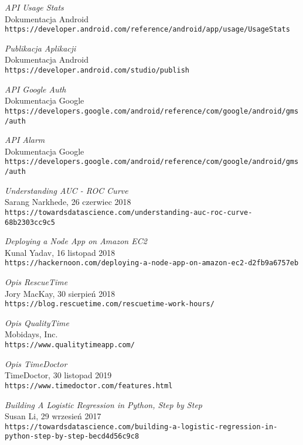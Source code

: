 \begin{thebibliography}{20}
\textit{API Usage Stats}
\\Dokumentacja Android
\\\texttt{https://developer.android.com/reference/android/app/usage/UsageStats}

\textit{Publikacja Aplikacji}
\\Dokumentacja Android
\\\texttt{https://developer.android.com/studio/publish}


\textit{API Google Auth}
\\Dokumentacja Google
\\\texttt{https://developers.google.com/android/reference/com/google/android/gms/auth}

\textit{API Alarm}
\\Dokumentacja Google
\\\texttt{https://developers.google.com/android/reference/com/google/android/gms/auth}

\textit{Understanding AUC - ROC Curve}
\\Sarang Narkhede, 26 czerwiec 2018
\\\texttt{https://towardsdatascience.com/understanding-auc-roc-curve-68b2303cc9c5}

\textit{Deploying a Node App on Amazon EC2}
\\Kunal Yadav, 16 listopad 2018
\\\texttt{https://hackernoon.com/deploying-a-node-app-on-amazon-ec2-d2fb9a6757eb}

\textit{Opis RescueTime}
\\Jory MacKay, 30 sierpień 2018
\\\texttt{https://blog.rescuetime.com/rescuetime-work-hours/}

\textit{Opis QualityTime}
\\Mobidays, Inc.
\\\texttt{https://www.qualitytimeapp.com/}



\textit{Opis TimeDoctor}
\\TimeDoctor, 30 listopad 2019
\\\texttt{https://www.timedoctor.com/features.html}

\textit{Building A Logistic Regression in Python, Step by Step}
\\Susan Li, 29 wrzesień 2017
\\\texttt{https://towardsdatascience.com/building-a-logistic-regression-in-\\python-step-by-step-becd4d56c9c8}


\end{thebibliography}

